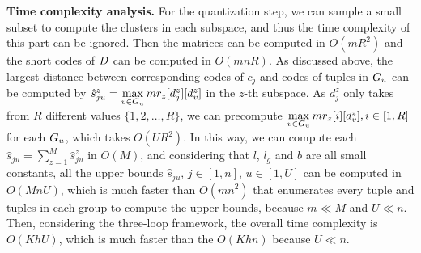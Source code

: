  
 
 
 
 

 
 
 \noindent \textbf{Time complexity analysis.}
 For the quantization step, we can sample a small subset to compute the clusters in each subspace, and thus the time complexity of this part can be ignored. 
 Then the matrices can be computed in $O(mR^2)$ and the short codes of $D$ can be computed in $O(mnR)$. 
 As discussed above,  the largest distance between corresponding codes of  $c_j$ and codes of tuples in $G_u$ can be computed by $\hat{s}_{ju}^z = \max\limits_{v\in G_u}mr_z[d_{j}^z][d_v^z]$ in the $z$-th subspace. 
 As $d_j^z$ only takes from $R$ different values $\{1, 2, \dots, R\}$, we can precompute $\max\limits_{v\in G_u}mr_z[i][d_v^z], i\in[1, R]$ for each $G_u$, which takes $O(UR^2)$. In this way, we can compute each $\hat{s}_{ju}=\sum_{z=1}^{M}\hat{s}^z_{ju}$ in $O(M)$, and considering that $l$, $l_g$ and  $b$ are all small constants, all the upper bounds $\hat{s}_{ju}$, $j\in [1,n]$, $u\in [1,U]$ can be computed in  $O(MnU)$, which is much faster than $O(mn^2)$ that enumerates every tuple and tuples in each group to compute the upper bounds, because $m \ll M$ and $U \ll n$. %
 Then, 
 considering the three-loop framework, the overall time complexity is $O(KhU)$, which is much faster than the $O(Khn)$ because $U \ll n$.
%
 
